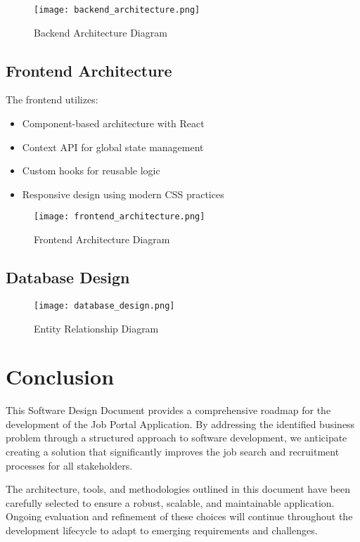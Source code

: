 \documentclass[12pt,a4paper]{article}
\begin{document}
\begin{figure}[H]
\centering
\texttt{[image: backend\_architecture.png]}
\caption{Backend Architecture Diagram}
\label{fig:backend-architecture}
\end{figure}

\subsection{Frontend Architecture}

The frontend utilizes:
\begin{itemize}
    \item Component-based architecture with React
    \item Context API for global state management
    \item Custom hooks for reusable logic
    \item Responsive design using modern CSS practices
\end{itemize}

\begin{figure}[H]
\centering
\texttt{[image: frontend\_architecture.png]}
\caption{Frontend Architecture Diagram}
\label{fig:frontend-architecture}
\end{figure}

\subsection{Database Design}

\begin{figure}[H]
\centering
\texttt{[image: database\_design.png]}
\caption{Entity Relationship Diagram}
\label{fig:er-diagram}
\end{figure}

\section{Conclusion}

This Software Design Document provides a comprehensive roadmap for the development of the Job Portal Application. By addressing the identified business problem through a structured approach to software development, we anticipate creating a solution that significantly improves the job search and recruitment processes for all stakeholders.

The architecture, tools, and methodologies outlined in this document have been carefully selected to ensure a robust, scalable, and maintainable application. Ongoing evaluation and refinement of these choices will continue throughout the development lifecycle to adapt to emerging requirements and challenges.



\end{document}
